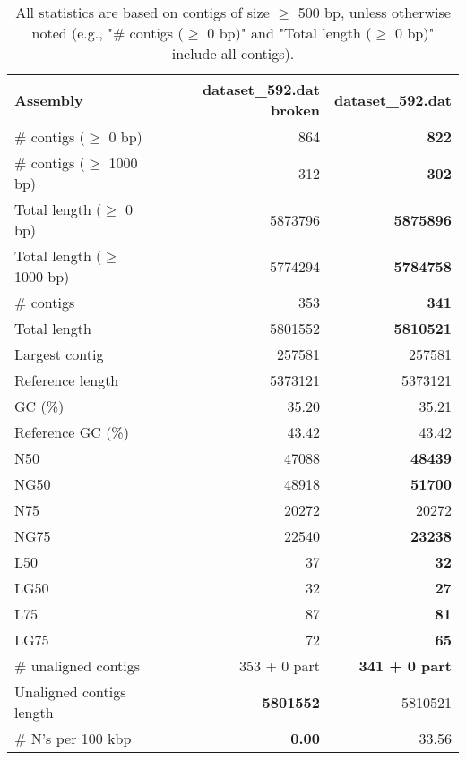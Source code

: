 \documentclass[12pt,a4paper]{article}
\begin{document}
\begin{table}[ht]
\begin{center}
\caption{All statistics are based on contigs of size $\geq$ 500 bp, unless otherwise noted (e.g., "\# contigs ($\geq$ 0 bp)" and "Total length ($\geq$ 0 bp)" include all contigs).}
\begin{tabular}{|l*{2}{|r}|}
\hline
Assembly & dataset\_592.dat broken & dataset\_592.dat \\ \hline
\# contigs ($\geq$ 0 bp) & 864 & {\bf 822} \\ \hline
\# contigs ($\geq$ 1000 bp) & 312 & {\bf 302} \\ \hline
Total length ($\geq$ 0 bp) & 5873796 & {\bf 5875896} \\ \hline
Total length ($\geq$ 1000 bp) & 5774294 & {\bf 5784758} \\ \hline
\# contigs & 353 & {\bf 341} \\ \hline
Total length & 5801552 & {\bf 5810521} \\ \hline
Largest contig & 257581 & 257581 \\ \hline
Reference length & 5373121 & 5373121 \\ \hline
GC (\%) & 35.20 & 35.21 \\ \hline
Reference GC (\%) & 43.42 & 43.42 \\ \hline
N50 & 47088 & {\bf 48439} \\ \hline
NG50 & 48918 & {\bf 51700} \\ \hline
N75 & 20272 & 20272 \\ \hline
NG75 & 22540 & {\bf 23238} \\ \hline
L50 & 37 & {\bf 32} \\ \hline
LG50 & 32 & {\bf 27} \\ \hline
L75 & 87 & {\bf 81} \\ \hline
LG75 & 72 & {\bf 65} \\ \hline
\# unaligned contigs & 353 + 0 part & {\bf 341 + 0 part} \\ \hline
Unaligned contigs length & {\bf 5801552} & 5810521 \\ \hline
\# N's per 100 kbp & {\bf 0.00} & 33.56 \\ \hline
\end{tabular}
\end{center}
\end{table}
\end{document}
